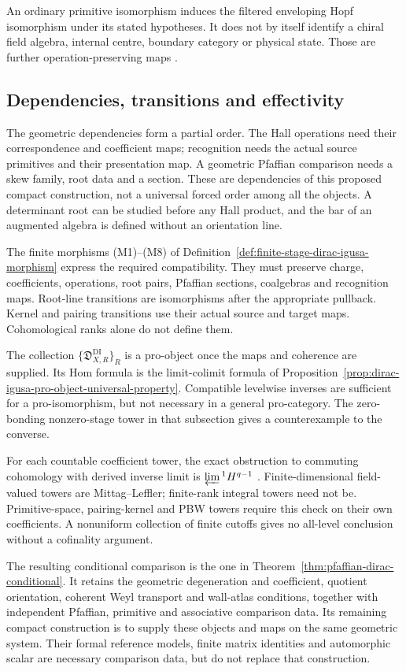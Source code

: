 An ordinary primitive isomorphism induces the filtered enveloping
Hopf isomorphism under its stated hypotheses. It does not by itself
identify a chiral field algebra, internal centre, boundary category
or physical state. Those are further operation-preserving maps
\cite{ChiralBarCobarVolI,ChiralBarCobarVolII,CYQGVolIII}.

\subsection{Dependencies, transitions and effectivity}
\label{app:build-ordered-dependencies}

The geometric dependencies form a partial order. The Hall operations
need their correspondence and coefficient maps; recognition needs
the actual source primitives and their presentation map. A geometric
Pfaffian comparison needs a skew family, root data and a section.
These are dependencies of this proposed compact construction, not
a universal forced order among all the objects. A determinant root
can be studied before any Hall product, and the bar of an augmented
algebra is defined without an orientation line.

The finite morphisms \textup{(M1)}--\textup{(M8)} of
Definition~\ref{def:finite-stage-dirac-igusa-morphism} express the
required compatibility. They must preserve charge, coefficients,
operations, root pairs, Pfaffian sections, coalgebras and recognition
maps. Root-line transitions are isomorphisms after the appropriate
pullback. Kernel and pairing transitions use their actual source
and target maps. Cohomological ranks alone do not define them.

The collection \(\{\mathfrak D^{\mathrm{DI}}_{X,R}\}_R\) is a
pro-object once the maps and coherence are supplied. Its Hom formula
is the limit-colimit formula of
Proposition~\ref{prop:dirac-igusa-pro-object-universal-property}.
Compatible levelwise inverses are sufficient for a pro-isomorphism,
but not necessary in a general pro-category. The zero-bonding
nonzero-stage tower in that subsection gives a counterexample to
the converse.

For each countable coefficient tower, the exact obstruction to
commuting cohomology with derived inverse limit is
\(\varprojlim{}^1 H^{q-1}\) \cite[\S3.5]{WeibelHA}.
Finite-dimensional field-valued
towers are Mittag--Leffler; finite-rank integral towers need not be.
Primitive-space, pairing-kernel and PBW towers require this check
on their own coefficients. A nonuniform collection of finite
cutoffs gives no all-level conclusion without a cofinality argument.

The resulting conditional comparison is the one in
Theorem~\ref{thm:pfaffian-dirac-conditional}. It retains the
geometric degeneration and coefficient, quotient orientation,
coherent Weyl transport and wall-atlas conditions, together with
independent Pfaffian, primitive and associative comparison data.
Its remaining compact construction is to supply these objects and
maps on the same geometric system. Their formal reference models,
finite matrix identities and automorphic scalar are necessary
comparison data, but do not replace that construction.
